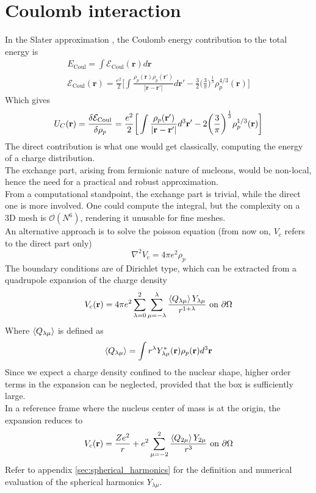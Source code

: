 \section{Coulomb interaction}
In the Slater approximation \cite{SlaterApp}, the Coulomb energy contribution to the total energy is
\begin{align}
    E_\text{Coul} = \int \mathcal E_\text{Coul}(\mathbf r) d\bm r
    \\\mathcal E_\text{Coul}(\bm r) = \frac{e^2}{2}\bigg[\int  \frac{\rho_p(\mathbf r )\rho_p(\mathbf r ' )}{|\mathbf r-\mathbf r'|}d\mathbf r'  - \frac 3 2 \bigg(\frac 3 \pi \bigg) ^{\frac 1 3}\rho_p^{4/3}(\mathbf r)\bigg]
\end{align}
Which gives
\begin{equation}
    U_{C}(\mathbf r) = \fdv{\mathcal E_\text{Coul}}{\rho_p} = \frac{e^2}{2}\bigg[\int \frac{\rho_p(\mathbf r ')}{|\mathbf r-\mathbf r'|} d^3 \mathbf r' - 2\bigg(\frac 3 \pi \bigg) ^{\frac 1 3} \rho_p^{1/3}(\mathbf r ) \bigg]
\end{equation}
The direct contribution is what one would get classically, computing the energy of a charge distribution.
\\The exchange part, arising from fermionic nature of nucleons, would be non-local, hence the need for a practical and robust approximation.
\\From a computational standpoint, the exchange part is trivial, while the direct one is more involved.
One could compute the integral, but the complexity on a 3D mesh is $\mathcal O(N^6)$, rendering it unusable for fine meshes.
\\An alternative approach is to solve the poisson equation (from now on, $V_c$ refers to the direct part only)
\begin{equation}
    \nabla^2 V_c = 4\pi e^2 \rho_p
\end{equation}
The boundary conditions are of Dirichlet type, which can be extracted from a quadrupole expansion of the charge density \cite{Jackson1998}
\begin{equation}
V_c (\mathbf r) = 4\pi e^2 \sum_{\lambda=0}^2\sum_{\mu=-\lambda}^\lambda \frac{\expval{Q_{\lambda\mu}} Y_{\lambda\mu}}{r^{1+\lambda}}\text{ on }\partial \Omega
\end{equation}
Where $\expval{Q_{\lambda\mu}}$ is defined as 
\begin{equation}
    \expval{Q_{\lambda\mu}} = \int r^\lambda Y_{\lambda\mu}^* (\mathbf r)\rho_p(\mathbf r ) d^3 \mathbf r
\end{equation}
Since we expect a charge density confined to the nuclear shape, higher order terms in the expansion can be neglected, provided that the box is sufficiently large.
\\In a reference frame where the nucleus center of mass is at the origin, the expansion reduces to
\begin{equation}
    V_{c}(\mathbf r ) = \frac{Ze^2}{r} + e^2\sum_{\mu=-2}^{2}\frac{\expval{Q_{2\mu}}Y_{2\mu}}{r^3} \text{ on } \partial \Omega
\end{equation}
Refer to appendix \ref{sec:spherical_harmonics} for the definition and numerical evaluation of the spherical harmonics $Y_{\lambda\mu}$.
